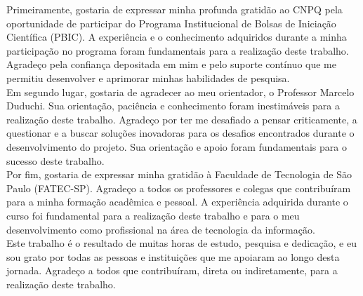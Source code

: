 %  
%  

\begin{agradecimentos}
  Primeiramente, gostaria de expressar minha profunda gratidão ao CNPQ pela oportunidade de participar do Programa Institucional de Bolsas de Iniciação Científica (PBIC). A experiência e o conhecimento adquiridos durante a minha participação no programa foram fundamentais para a realização deste trabalho. Agradeço pela confiança depositada em mim e pelo suporte contínuo que me permitiu desenvolver e aprimorar minhas habilidades de pesquisa.
  \\

  Em segundo lugar, gostaria de agradecer ao meu orientador, o Professor Marcelo Duduchi. Sua orientação, paciência e conhecimento foram inestimáveis para a realização deste trabalho. Agradeço por ter me desafiado a pensar criticamente, a questionar e a buscar soluções inovadoras para os desafios encontrados durante o desenvolvimento do projeto. Sua orientação e apoio foram fundamentais para o sucesso deste trabalho.
  \\

  Por fim, gostaria de expressar minha gratidão à Faculdade de Tecnologia de São Paulo (FATEC-SP). Agradeço a todos os professores e colegas que contribuíram para a minha formação acadêmica e pessoal. A experiência adquirida durante o curso foi fundamental para a realização deste trabalho e para o meu desenvolvimento como profissional na área de tecnologia da informação.
  \\
  
  Este trabalho é o resultado de muitas horas de estudo, pesquisa e dedicação, e eu sou grato por todas as pessoas e instituições que me apoiaram ao longo desta jornada. Agradeço a todos que contribuíram, direta ou indiretamente, para a realização deste trabalho.
\end{agradecimentos}

